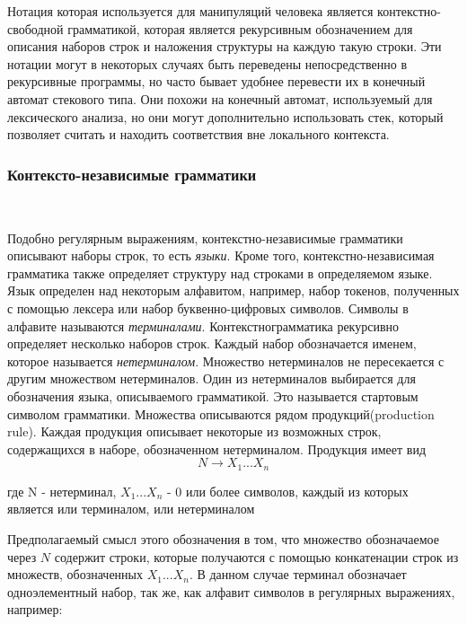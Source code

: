 Нотация которая используется для манипуляций человека является контекстно-свободной грамматикой, которая является рекурсивным обозначением для описания наборов строк и наложения структуры на каждую такую строки. Эти нотации могут в некоторых случаях быть переведены непосредственно в рекурсивные программы, но часто бывает удобнее перевести их в конечный автомат стекового типа. Они похожи на конечный автомат, используемый для лексического анализа, но они могут дополнительно использовать стек, который позволяет считать и находить соответствия вне локального контекста.
\subsubsection{Контексто-независимые грамматики}~
\label{sub:arch_and_mod:grammars}

Подобно регулярным выражениям, контекстно-независимые грамматики описывают наборы строк, то есть \textit{языки}. Кроме того, контекстно-независимая грамматика также определяет структуру над строками в определяемом языке. Язык определен над некоторым алфавитом, например, набор токенов, полученных с помощью лексера или набор буквенно-цифровых символов. Символы в алфавите называются \textit{терминалами}. Контекстно грамматика рекурсивно определяет несколько наборов строк. Каждый набор обозначается именем, которое называется \textit{нетерминалом}. Множество нетерминалов не пересекается с другим множеством нетерминалов. Один из нетерминалов выбирается для обозначения языка, описываемого грамматикой. Это называется стартовым символом грамматики. Множества описываются рядом продукций(production rule). Каждая продукция описывает некоторые из возможных строк, содержащихся в наборе, обозначенном нетерминалом. Продукция имеет вид
\begin{equation}
  N \rightarrow X_1...X_n
\end{equation}
\begin{explanation}
где N - нетерминал, $X_1...X_n$ - 0 или более символов, каждый из которых \\
    является или терминалом, или нетерминалом
\end{explanation}

Предполагаемый смысл этого обозначения в том, что множество обозначаемое через $N$ содержит строки, которые получаются с помощью конкатенации строк из множеств, обозначенных
$X_1...X_n$. В данном случае терминал обозначает одноэлементный набор, так же, как алфавит символов в регулярных выражениях, например:

